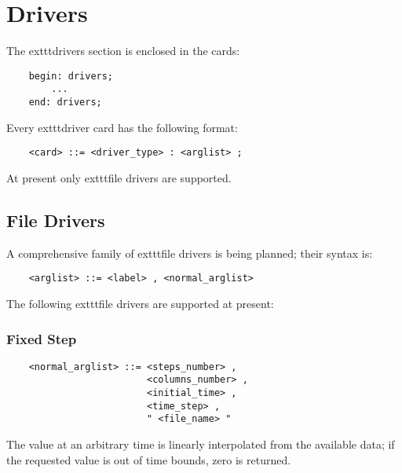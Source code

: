 \chapter{Drivers}\label{sec:DRIVERS}
The 	exttt{drivers} section is enclosed in the cards:
\begin{verbatim}
    begin: drivers;
        ...
    end: drivers;
\end{verbatim}
Every 	exttt{driver} card has the following format:
\begin{verbatim}
    <card> ::= <driver_type> : <arglist> ;
\end{verbatim}
At present only 	exttt{file} drivers are supported.

\section{File Drivers}
A comprehensive family of 	exttt{file} drivers is being planned;
their syntax is:
\begin{verbatim}
    <arglist> ::= <label> , <normal_arglist>
\end{verbatim}
The following 	exttt{file} drivers are supported at present:


\subsection{Fixed Step}
\begin{verbatim}
    <normal_arglist> ::= <steps_number> ,
                         <columns_number> ,
                         <initial_time> ,
                         <time_step> ,
                         " <file_name> "
\end{verbatim}
The value at an arbitrary time is linearly interpolated from the available
data; if the requested value is out of time bounds, zero is returned.

